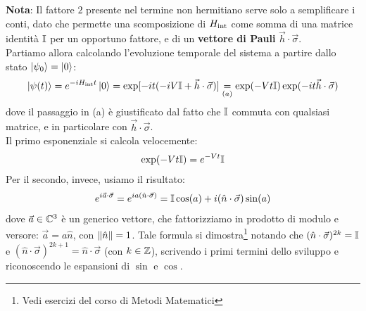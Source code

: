 \documentclass[../../InformazioneQuantistica.tex]{subfiles}
\begin{document}
\textbf{Nota}: Il fattore $2$ presente nel termine non hermitiano serve solo a semplificare i conti, dato che permette una scomposizione di $H_{\operatorname{int}}$ come somma di una matrice identità $\mathbb{I}$ per un opportuno fattore, e di un \textbf{vettore di Pauli} $\vec{h}\cdot \vec{\sigma}$.\\


Partiamo allora calcolando l'evoluzione temporale del sistema a partire dallo stato $\Ket{\psi_0}=\Ket{0}$:
\begin{align*}
\Ket{\psi(t)} = e^{-iH_{\operatorname{int}}t} \Ket{0} = \exp[{-it(-iV\mathbb{I}+\vec{h}\cdot\vec{\sigma})}] \underset{(a)}{=} \exp(-Vt\mathbb{I})\exp(-it\vec{h}\cdot \vec{\sigma})
\end{align*}
dove il passaggio in (a) è giustificato dal fatto che $\mathbb{I}$ commuta con qualsiasi matrice, e in particolare con $\vec{h}\cdot \vec{\sigma}$.\\
Il primo esponenziale si calcola velocemente:
\begin{align*}
\exp(-Vt \mathbb{I}) = e^{-Vt}\mathbb{I} 
\end{align*}
Per il secondo, invece, usiamo il risultato:
\begin{align}
e^{i\vec{a}\cdot \vec{\sigma}}=e^{ia(\hat{n}\cdot \vec{\sigma})} = \mathbb{I}\cos(a) + i(\hat{n}\cdot \vec{\sigma})\sin(a)
\label{eqn:exp-pauli-vector}
\end{align}
dove $\vec{a} \in \mathbb{C}^3$ è un generico vettore, che fattorizziamo in prodotto di modulo e versore: $\vec{a}=a\hat{n}$, con $\left\lVert\hat{n}\right\rVert=1$. Tale formula si dimostra\footnote{Vedi esercizi del corso di Metodi Matematici} notando che $(\hat{n}\cdot \vec{\sigma})^{2k}=\mathbb{I}$ e $(\hat{n}\cdot \vec{\sigma})^{2k+1}=\hat{n}\cdot\vec{\sigma}$ (con $k\in \mathbb{Z}$), scrivendo i primi termini dello sviluppo e riconoscendo le espansioni di $\sin$ e $\cos$.\\
\end{document}
